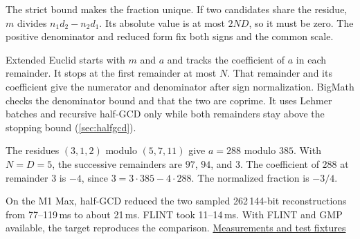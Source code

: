 The strict bound makes the fraction unique. If two candidates share
the residue, $m$ divides $n_1d_2-n_2d_1$. Its absolute value is at
most $2ND$, so it must be zero. The positive denominator and
reduced form fix both signs and the common scale.

Extended Euclid starts with $m$ and $a$ and tracks the coefficient of
$a$ in each remainder. It stops at the first remainder at most $N$.
That remainder and its coefficient give the numerator and denominator
after sign normalization. BigMath checks the denominator bound and
that the two are coprime. It uses Lehmer batches and recursive half-GCD
only while both remainders stay above the stopping bound
(\cref{sec:halfgcd}).

\begin{example}
The residues $(3,1,2)$ modulo $(5,7,11)$ give $a=288$ modulo $385$.
With $N=D=5$, the successive remainders are $97$, $94$, and $3$.
The coefficient of $288$ at remainder $3$ is $-4$, since
$3=3\cdot385-4\cdot288$. The normalized fraction is $-3/4$.
\end{example}

\begin{perfnote}
On the M1 Max, half-GCD reduced the two sampled 262\,144-bit
reconstructions from 77--119\,ms to about 21\,ms. FLINT took
11--14\,ms. With FLINT and GMP available, the
 target reproduces the comparison.
\href{https://github.com/mmurshed/biginteger/blob/main/BENCHMARK.md\#bounded-rational-reconstruction}{Measurements and test fixtures}
\end{perfnote}

